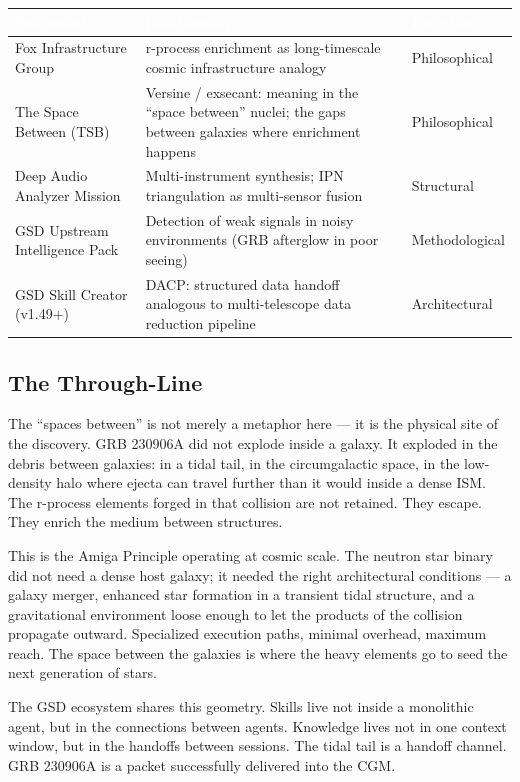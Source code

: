 \documentclass[11pt,letterpaper]{article}
\newcommand{\tableheader}[1]{\textbf{\sffamily\textcolor{white}{#1}}}
\begin{document}
\begin{center}
\begin{tabularx}{\textwidth}{L{4cm}XC{2.5cm}}
\toprule
{}
\tableheader{Document} & \tableheader{Relationship} & \tableheader{Direction} \\
\midrule
Fox Infrastructure Group & r-process enrichment as long-timescale cosmic infrastructure analogy & Philosophical \\
The Space Between (TSB) & Versine / exsecant: meaning in the ``space between'' nuclei; the gaps between galaxies where enrichment happens & Philosophical \\
Deep Audio Analyzer Mission & Multi-instrument synthesis; IPN triangulation as multi-sensor fusion & Structural \\
GSD Upstream Intelligence Pack & Detection of weak signals in noisy environments (GRB afterglow in poor seeing) & Methodological \\
GSD Skill Creator (v1.49+) & DACP: structured data handoff analogous to multi-telescope data reduction pipeline & Architectural \\
\bottomrule
\end{tabularx}
\end{center}

\subsection{The Through-Line}

The ``spaces between'' is not merely a metaphor here --- it is the physical site of the discovery. GRB 230906A did not explode inside a galaxy. It exploded in the debris between galaxies: in a tidal tail, in the circumgalactic space, in the low-density halo where ejecta can travel further than it would inside a dense ISM. The r-process elements forged in that collision are not retained. They escape. They enrich the medium between structures.

This is the Amiga Principle operating at cosmic scale. The neutron star binary did not need a dense host galaxy; it needed the right architectural conditions --- a galaxy merger, enhanced star formation in a transient tidal structure, and a gravitational environment loose enough to let the products of the collision propagate outward. Specialized execution paths, minimal overhead, maximum reach. The space between the galaxies is where the heavy elements go to seed the next generation of stars.

The GSD ecosystem shares this geometry. Skills live not inside a monolithic agent, but in the connections between agents. Knowledge lives not in one context window, but in the handoffs between sessions. The tidal tail is a handoff channel. GRB 230906A is a packet successfully delivered into the CGM.
\end{document}
